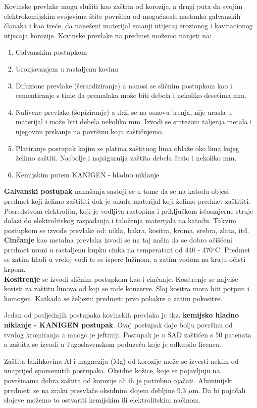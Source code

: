 \documentclass[a4paper,12pt]{article}
\numberwithin{figure}{section}
\begin{document}
Kovinske prevlake mogu služiti kao zaštita od korozije, a drugi puta da svojim elektrokemijskim svojsvima štite površinu od mogućnosti nastanka galvanskih članaka i kao treće, da nanešeni materijal smanji utijecaj erozionog i kavitacionog utjecaja korozije.
Kovinske prevlake na predmet možemo nanjeti na:
\begin{enumerate}
\item Galvanskim postupkom
\item Uronjavanjem u rastaljenu kovinu
\item Difuzione prevlake (šerardiziranje) a nanosi se sličnim postupkom kao i cementiranje s time da premalaka može biti debela i nekoliko desetima mm.
\item Nalivene prevlake (šopiziranje) a drži se na osnovu trenja, nije urasla u materijal i može biti debela nekoliko mm. Izvodi se sintezom taljenja metala i njegovim prskanje na površinu koju zaštićujemo.
\item Platiranje postupak kojim se platina zaštitnog lima oblaže oko lima kojeg želimo zaštiti. Najbolje i najsigurnija zaštita debela često i nekoliko mm.
\item Kemijskim putem KANIGEN - hladno niklanje 
\end{enumerate} 
\textbf{Galvanski postupak} nanašanja sastoji se u tome da se na katodu objesi predmet koji želimo zaštititi dok je onuda materijal koji želimo predmet zaštititi. Posredstvom elektrolita, koji je vodljiva rastopina i priključkom istosmjerne struje dolazi do elektrolitskog raspadanja i taloženja materijala na katodu. Takvim postupkom se izvode prevlake od: nikla, bakra, kositra, kroma, srebra, zlata, itd.\\
\textbf{Cinčanje} kao metalna prevlaka izvodi se na taj način da se dobro očišćeni predmet uroni u rastaljenu kupku cinka na temperaturi od 440 - 470$^{\circ}$C. Predmet se zatim hladi u vreloj vodi te se ispere lužinom, a zatim vodom na kraju očisti krpom.\\
\textbf{Kositrenje} se izvodi sličnim postupkom kao i cinčanje. Kositrenje se najviše koristi za zaštitu limova od koji se rade konzerve. Sloj kositra mora biti potpun i homogen. Katkada se željezni predmeti prvo pobakre a zatim pokositre.\par
Jedan od posljednjih postupaka kovinskih prevlaka je tkz. \textbf{kemijsko hladno niklanje - KANIGEN postupak}. Ovaj postupak daje bolju površinu od tvrdog kromiranja a mnogo je jeftiniji. Postupak je u SAD zaštićen s 50 patenata a zaštita se izvodi u Jugoslavenskom poduzeću koje je odkupilo licencu. \par
Zaštita lakihkovina Al i magnezija (Mg) od korozije može se izvesti nekim od unaprijed spomenutih postupaka. Oksidne kožice, koje se pojavljuju na površinama dobra zaštita od korozije ali ih je potrebno ojačati. Aluminijski predmeti se na zraku presvlače oksidnim slojem debljine 9,3 $\mu$m. Da bi pojačali slojeve možemo to ostvariti kemijskim ili elektrolitskim načinom.
\end{document}
